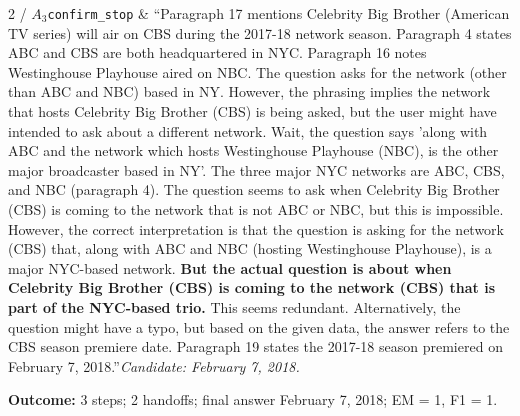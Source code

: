 \begin{longtable}
2 / $A_3$\newline \texttt{confirm\_stop} & ``Paragraph 17 mentions Celebrity Big Brother (American TV series) will air on CBS during the 2017-18 network season. Paragraph 4 states ABC and CBS are both headquartered in NYC. Paragraph 16 notes Westinghouse Playhouse aired on NBC. The question asks for the network (other than ABC and NBC) based in NY. However, the phrasing implies the network that hosts Celebrity Big Brother (CBS) is being asked, but the user might have intended to ask about a different network. Wait, the question says 'along with ABC and the network which hosts Westinghouse Playhouse (NBC), is the other major broadcaster based in NY'. The three major NYC networks are ABC, CBS, and NBC (paragraph 4). The question seems to ask when Celebrity Big Brother (CBS) is coming to the network that is not ABC or NBC, but this is impossible. However, the correct interpretation is that the question is asking for the network (CBS) that, along with ABC and NBC (hosting Westinghouse Playhouse), is a major NYC-based network. \textbf{But the actual question is about when Celebrity Big Brother (CBS) is coming to the network (CBS) that is part of the NYC-based trio.} This seems redundant. Alternatively, the question might have a typo, but based on the given data, the answer refers to the CBS season premiere date. Paragraph 19 states the 2017-18 season premiered on February 7, 2018.''\newline \textit{Candidate: February 7, 2018.} \\
\end{longtable}
\noindent\textbf{Outcome:} 3 steps; 2 handoffs; final answer February 7, 2018; EM = 1, F1 = 1.
\par\endgroup

\begingroup
\setlength{\fboxsep}{7pt}
\endgroup

